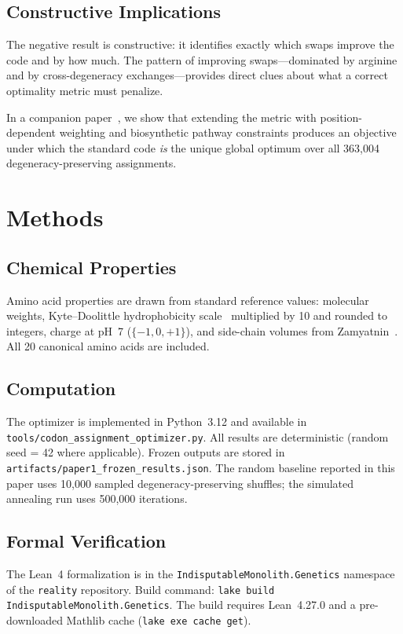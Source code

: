 \documentclass[11pt,twocolumn]{article}
\begin{document}
\subsection{Constructive Implications}

The negative result is constructive: it identifies exactly which swaps
improve the code and by how much. The pattern of improving swaps---dominated
by arginine and by cross-degeneracy exchanges---provides direct clues about
what a correct optimality metric must penalize.

In a companion paper~\citep{Paper2}, we show that extending the metric with
position-dependent weighting and biosynthetic pathway constraints produces
an objective under which the standard code \emph{is} the unique global
optimum over all 363,004 degeneracy-preserving assignments.

\section{Methods}

\subsection{Chemical Properties}

Amino acid properties are drawn from standard reference values: molecular
weights, Kyte--Doolittle hydrophobicity
scale~\citep{KyteDoolittle1982} multiplied by 10 and rounded to integers,
charge at pH~7 ($\{-1, 0, +1\}$), and side-chain volumes from
Zamyatnin~\citep{Zamyatnin1972}. All 20 canonical amino acids are included.

\subsection{Computation}

The optimizer is implemented in Python~3.12 and available in
\texttt{tools/codon\_assignment\_optimizer.py}. All results are
deterministic (random seed = 42 where applicable). Frozen outputs are
stored in \texttt{artifacts/paper1\_frozen\_results.json}. The random
baseline reported in this paper uses 10,000 sampled degeneracy-preserving
shuffles; the simulated annealing run uses 500,000 iterations.

\subsection{Formal Verification}

The Lean~4 formalization is in the \texttt{IndisputableMonolith.Genetics}
namespace of the \texttt{reality} repository. Build command:
\texttt{lake build IndisputableMonolith.Genetics}. The build requires
Lean~4.27.0 and a pre-downloaded Mathlib cache (\texttt{lake exe cache get}).
\end{document}
